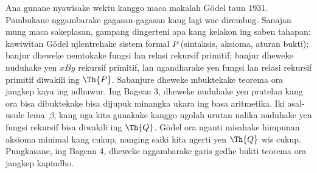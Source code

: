\documentclass[../../../include/open-logic-section]{subfiles}
\begin{document}


Ana gunane nyawisake wektu kanggo maca makalah G\"odel taun 1931.
Pambukane nggambarake gagasan-gagasan kang lagi wae dirembug.
Sanajan mung maca sakeplasan, gampang dingerteni apa kang kelakon ing
saben tahapan: kawiwitan G\"odel njlentrehake sistem formal $P$
(sintaksis, aksioma, aturan bukti); banjur dheweke nemtokake fungsi
lan relasi rekursif primitif; banjur dheweke nuduhake yen $x B y$
rekursif primitif, lan ngandharake yen fungsi lan relasi rekursif
primitif diwakili ing $\Th{P}$. Sabanjure dheweke mbuktekake
teorema ora jangkep kaya ing ndhuwur. Ing Bagean 3, dheweke nuduhake
yen pratelan kang ora bisa dibuktekake bisa dijupuk minangka ukara
ing basa aritmetika. Iki asal-usule lema~$\beta$, kang uga kita
gunakake kanggo ngolah urutan nalika nuduhake yen fungsi rekursif
bisa diwakili ing $\Th{Q}$. G\"odel ora nganti misahake
himpunan aksioma minimal kang cukup, nanging saiki kita ngerti yen
$\Th{Q}$ wis cukup. Pungkasane, ing Bagean 4, dheweke nggambarake
garis gedhe bukti teorema ora jangkep kapindho.
\end{document}
